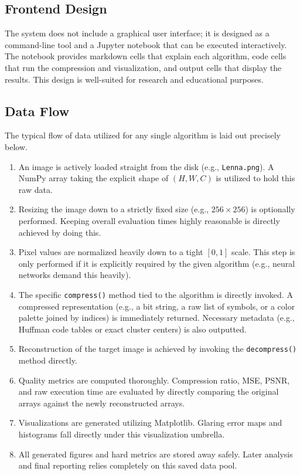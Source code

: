 \subsection{Frontend Design}

The system does not include a graphical user interface; it is designed as a command-line tool and a Jupyter notebook that can be executed interactively. The notebook provides markdown cells that explain each algorithm, code cells that run the compression and visualization, and output cells that display the results. This design is well-suited for research and educational purposes.


\subsection{Data Flow}

The typical flow of data utilized for any single algorithm is laid out precisely below.

\begin{enumerate}
    \item An image is actively loaded straight from the disk (e.g., \texttt{Lenna.png}). A NumPy array taking the explicit shape of $(H,W,C)$ is utilized to hold this raw data.
    
    \item Resizing the image down to a strictly fixed size (e.g., $256\times256$) is optionally performed. Keeping overall evaluation times highly reasonable is directly achieved by doing this.
    
    \item Pixel values are normalized heavily down to a tight $[0,1]$ scale. This step is only performed if it is explicitly required by the given algorithm (e.g., neural networks demand this heavily).
    
    \item The specific \texttt{compress()} method tied to the algorithm is directly invoked. A compressed representation (e.g., a bit string, a raw list of symbols, or a color palette joined by indices) is immediately returned. Necessary metadata (e.g., Huffman code tables or exact cluster centers) is also outputted.
    
    \item Reconstruction of the target image is achieved by invoking the \texttt{decompress()} method directly.
    
    \item Quality metrics are computed thoroughly. Compression ratio, MSE, PSNR, and raw execution time are evaluated by directly comparing the original arrays against the newly reconstructed arrays.
    
    \item Visualizations are generated utilizing Matplotlib. Glaring error maps and histograms fall directly under this visualization umbrella.
    
    \item All generated figures and hard metrics are stored away safely. Later analysis and final reporting relies completely on this saved data pool.
\end{enumerate}

